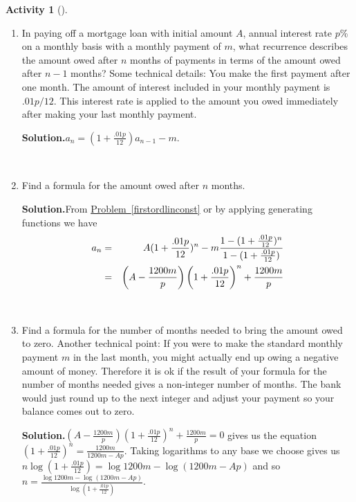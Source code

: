 \documentclass[10pt,]{book}
\theoremstyle{plain}
\theoremstyle{definition}
\newtheorem{activity}[project]{Activity}
\numberwithin{equation}{chapter}
\newcommand{\amp}{&}
\begin{document}
\begin{activity}[]\label{activity-198}
~\par
\begin{enumerate}[label=(\alph*)]
 \item In paying off a mortgage loan with initial amount \(A\), annual interest rate \(p\)\% on a monthly basis with a monthly payment of \(m\), what recurrence describes the amount owed after \(n\) months of payments in terms of the amount owed after \(n-1\) months?  Some technical details: You make the first payment after one month.  The amount of interest included in your monthly payment is \(.01p/12\).  This interest rate is applied to the amount you owed immediately after making your last monthly payment.%
\par\medskip\noindent%
\textbf{Solution.}\quad \(a_n=(1+\frac{.01p}{12})a_{n-1}-m\).%

~\par
\item Find a formula for the amount owed after \(n\) months.%
\par\medskip\noindent%
\textbf{Solution.}\quad From \hyperref[firstordlinconst]{Problem~\ref{firstordlinconst}} or by applying generating functions we have%
\begin{align*}
a_n \amp =\amp  A(1+\frac{.01p}{12})^n-m{1-(1+\frac{.01p}{12})^n\over 1-(1+\frac{.01p}{12})}\\
\amp =\amp  \left(A-\frac{1200m}{p}\right)\left(1+\frac{.01p}{12}\right)^n+\frac{1200m}{p}
\end{align*}
%

~\par
\item Find a formula for the number of months needed to bring the amount owed to zero.  Another technical point: If you were to make the standard monthly payment \(m\) in the last month, you might actually end up owing a negative amount of money.  Therefore it is ok if the result of your formula for the number of months needed gives a non-integer number of months.  The bank would just round up to the next integer and adjust your payment so your balance comes out to zero.%
\par\medskip\noindent%
\textbf{Solution.}\quad \(\left(A-\frac{1200m}{p}\right)\left(1+\frac{.01p}{12}\right)^n+\frac{1200m}{p}=0\) gives us the equation \(\left(1+\frac{.01p}{12}\right)^n=\frac{1200m}{1200m-Ap}\). Taking logarithms to any base we choose gives us \(n\log (1+\frac{.01p}{12})=\log 1200m-\log (1200m-Ap)\) and so \(n=\frac{\log 1200m-\log (1200m-Ap)}{\log (1+\frac{.01p}{12})}\).%


\end{enumerate}
\end{activity}
\end{document}

